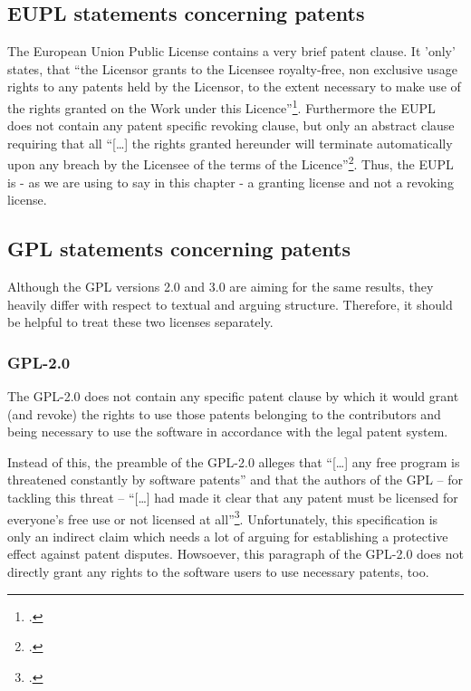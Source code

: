 \subsection{EUPL statements concerning patents}\label{subsec:EupLPatentClause}
The European Union Public License contains a very brief patent clause. It 'only'
states, that \enquote{the Licensor grants to the Licensee royalty-free, non
exclusive usage rights to any patents held by the Licensor, to the extent
necessary to make use of the rights granted on the Work under this
Licence}\footcite[cf.][\nopage wp.\ §2 at its tail]{EuplLicense2007en}.
Furthermore the EUPL does not contain any patent specific revoking clause, but
only an abstract clause requiring that all \enquote{[\ldots] the rights granted
hereunder will terminate automatically upon any breach by the Licensee of the
terms of the Licence}\footcite[cf.][\nopage wp.\ §12]{EuplLicense2007en}. Thus,
the EUPL is - as we are using to say in this chapter - a granting license and
not a revoking license.

\subsection{GPL statements concerning patents}

Although the GPL versions 2.0 and 3.0 are aiming for the same results, they
heavily differ with respect to textual and arguing structure. Therefore, it
should be helpful to treat these two licenses separately.

\subsubsection {GPL-2.0} \label{subsec:Gpl21PatentClause}

The GPL-2.0 does not contain any specific patent clause by which it would grant
(and revoke) the rights to use those patents belonging to the contributors and 
being necessary to use the software in accordance with the legal patent system.

Instead of this, the preamble of the GPL-2.0 alleges that \enquote{[\ldots] any
free program is threatened constantly by software patents} and that the authors
of the GPL -- for tackling this threat -- \enquote{[\ldots] had made it clear
that any patent must be licensed for everyone's free use or not licensed at
all}\footcite[cf.][\nopage wp., Preamble]{Gpl20OsiLicense1991a}. Unfortunately,
this specification is only an indirect claim which needs a lot of arguing for
establishing a protective effect against patent disputes. Howsoever, this
paragraph of the GPL-2.0 does not directly grant any rights to the software
users to use necessary patents, too.

